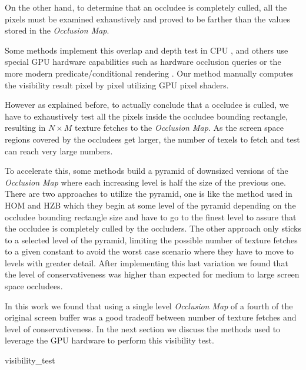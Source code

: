 \documentclass[10pt, conference]{IEEEtran}
\begin{document}
On the other hand, to determine that an occludee is completely culled, all the pixels must be examined exhaustively and proved to be farther than the values stored in the \emph{Occlusion Map}.\
 
Some methods implement this overlap and depth test in CPU \cite{frostbite, intel_sw_occ_cull,  lazy_occlusion_grid, cacic_occlusion_2},  
and others use special GPU hardware capabilities such as hardware occlusion queries \cite{nv_occlusion_queries} or the more modern 
predicate/conditional rendering \cite{dx_predicate_rendering, nv_conditional_render}. 
Our method manually computes the visibility result pixel by pixel utilizing GPU pixel shaders.\

However as explained before, to actually conclude that a occludee is culled, we have to exhaustively test all the pixels inside the occludee bounding 
rectangle, resulting in $N \times M$ texture fetches to the \emph{Occlusion Map}. 
As the screen space regions covered by the occludees get larger, the number of texels to fetch and test can reach very large numbers.\

To accelerate this, some methods build a pyramid of downsized versions of the \emph{Occlusion Map} where each increasing level is half the size of the previous one. 
There are two approaches to utilize the pyramid, one is like the method used in HOM \cite{hom} and HZB \cite{Hierarchical_zbuffer} which they begin at 
some level of the pyramid depending on the occludee bounding rectangle size and have to go to the finest level to assure that the occludee is completely 
culled by the occluders.
The other approach \cite{rakos,darnell} only sticks to a selected level of the pyramid, limiting the possible number of texture fetches to a given 
constant to avoid the worst case scenario where they have to move to levels with greater detail. After implementing this last variation we found that the level of conservativeness was higher than expected for medium to large screen space occludees.\

In this work we found that using a single level \emph{Occlusion Map} of a fourth of the original screen buffer was a good tradeoff between number of texture fetches and level of conservativeness. In the next section we discuss the methods used to leverage the GPU hardware to perform this visibility test.


{visibility_test}{
%
}
\end{document}

